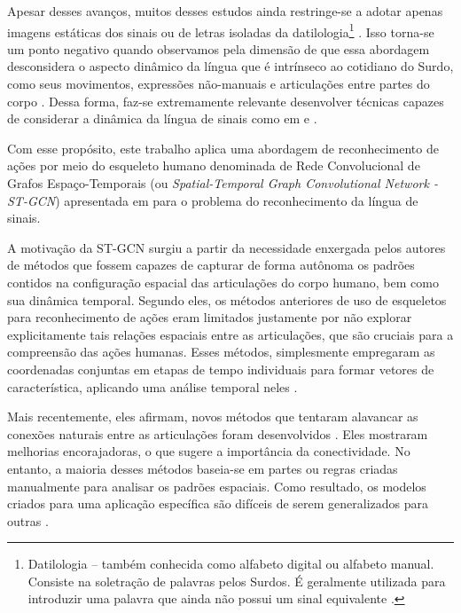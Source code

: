 Apesar desses avanços, muitos desses estudos ainda restringe-se a adotar apenas imagens estáticas dos sinais ou de letras isoladas da datilologia\footnote{
     Datilologia – também conhecida como alfabeto digital ou alfabeto manual. Consiste na soletração de palavras pelos Surdos. É geralmente utilizada para introduzir uma palavra que ainda não possui um sinal equivalente \cite{quadros-2004, pereira-choi-2011}.
} \cite{shanta-2018, taskiran-2018, elbadawy-2017, das-2018, sajanraj-2018}. Isso torna-se um ponto negativo quando observamos pela dimensão de que essa abordagem desconsidera o aspecto dinâmico da língua que é intrínseco ao cotidiano do Surdo, como seus movimentos, expressões não-manuais e articulações entre partes do corpo \cite{quadros-2004}. Dessa forma, faz-se extremamente relevante desenvolver técnicas capazes de considerar a dinâmica da língua de sinais como em \cite{konstantinidis-2018} e \cite{pigou-2017}. 

Com esse propósito, este trabalho aplica uma abordagem de reconhecimento de ações por meio do esqueleto humano denominada de Rede Convolucional de Grafos Espaço-Temporais (ou \textit{Spatial-Temporal Graph Convolutional Network - ST-GCN}) apresentada em \cite{st-gcn-2018} para o problema do reconhecimento da língua de sinais. 

A motivação da ST-GCN surgiu a partir da necessidade enxergada pelos autores de métodos que fossem capazes de capturar de forma autônoma os padrões contidos na configuração espacial das articulações do corpo humano, bem como sua dinâmica temporal. Segundo eles, os métodos anteriores de uso de esqueletos para reconhecimento de ações eram limitados justamente por não explorar explicitamente tais relações espaciais entre as articulações, que são cruciais para a compreensão das ações humanas. Esses métodos, simplesmente empregaram as coordenadas conjuntas em etapas de tempo individuais para formar vetores de característica, aplicando uma análise temporal neles \cite{st-gcn-2018, wang-2012, fernando-2015}.

Mais recentemente, eles afirmam, novos métodos que tentaram alavancar as conexões naturais entre as articulações foram desenvolvidos \cite{shahroudy-2016, yong-du-2015}. Eles mostraram melhorias encorajadoras, o que sugere a importância da conectividade. No entanto, a maioria desses métodos baseia-se em partes ou regras criadas manualmente para analisar os padrões espaciais. Como resultado, os modelos criados para uma aplicação específica são difíceis de serem generalizados para outras \cite{st-gcn-2018}.

